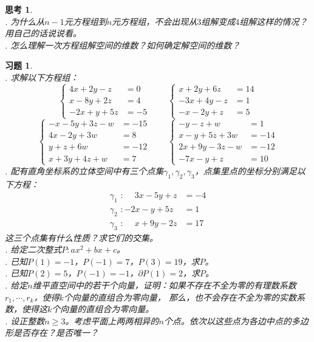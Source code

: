 \documentclass[12pt,UTF8]{ctexbook}
\theoremstyle{definition}
\theoremstyle{plain}
\newtheorem{sk}{思考}[section]
\newtheorem{xt}{习题}[section]
\begin{document}
\begin{sk}
    \mbox{} \\
    . 为什么从$n-1$元方程组到$n$元方程组，不会出现从$3$组解变成$4$组解这样的情况？用自己的话说说看。\\
    . 怎么理解一次方程组解空间的维数？如何确定解空间的维数？

\end{sk}

\begin{xt}
    \mbox{} \\
    . 求解以下方程组：
    $$ \left\{
        \begin{array}{rl}
    4x + 2y - z &= 0 \\
    x -  8y + 2z &= 4  \\
    -2x + y + 5z &= -5
    \end{array}
    \right. 
    \qquad\left\{
        \begin{array}{rl}
            x + 2y + 6z &= 14 \\
            -3x + 4y - z &= 1  \\
            -x -  2y + z &= 5 
    \end{array}
    \right. 
    $$  
    $$ \left\{
        \begin{array}{rl}
    -x - 5y + 3z  - w &= -15 \\
    4x - 2y + 3w &= 8 \\
    y + z  + 6w &= -12 \\
    x + 3y + 4z  + w &= 7
    \end{array}
    \right. 
    \qquad\left\{
        \begin{array}{rl}
            -y - z + w &= 1 \\
            x - y + 5z + 3w &= -14 \\
            2x + 9y - 3z  - w &= -12 \\
            -7x - y + z &= 10
    \end{array}
    \right. 
    $$  
    . 配有直角坐标系的立体空间中有三个点集$\gamma_1, \gamma_2, \gamma_3$，点集里点的坐标分别满足以下方程：
    \begin{align*}
        \gamma_1\,\,: \phantom{-}3x - 5y + z  &= -4 \\
        \gamma_2\,\,: -2x - y + 5z &= 1 \\
        \gamma_3\,\,: \phantom{-}x  + 9y - 2z &= 17
    \end{align*}
    这三个点集有什么性质？求它们的交集。\\
    . 给定二次整式$P: ax^2 + bx + c$。\\
    . 已知$P(1) = -1$，$P(-1) = 7$，$P(3) = 19$，求$P$。\\
    . 已知$P(2) = 5$，$P(-1) = -1$，$\partial P(1) = 2$，求$P$。\\
    . 给定$n$维平直空间中的若干个向量，证明：如果不存在不全为零的有理数系数$r_1, \cdots , r_k$，使得$k$个向量的直组合为零向量，
    那么，也不会存在不全为零的实数系数，使得这$k$个向量的直组合为零向量。\\
    . 设正整数$n\geqslant 3$。考虑平面上两两相异的$n$个点。依次以这些点为各边中点的多边形是否存在？是否唯一？
\end{xt}
\end{document}
